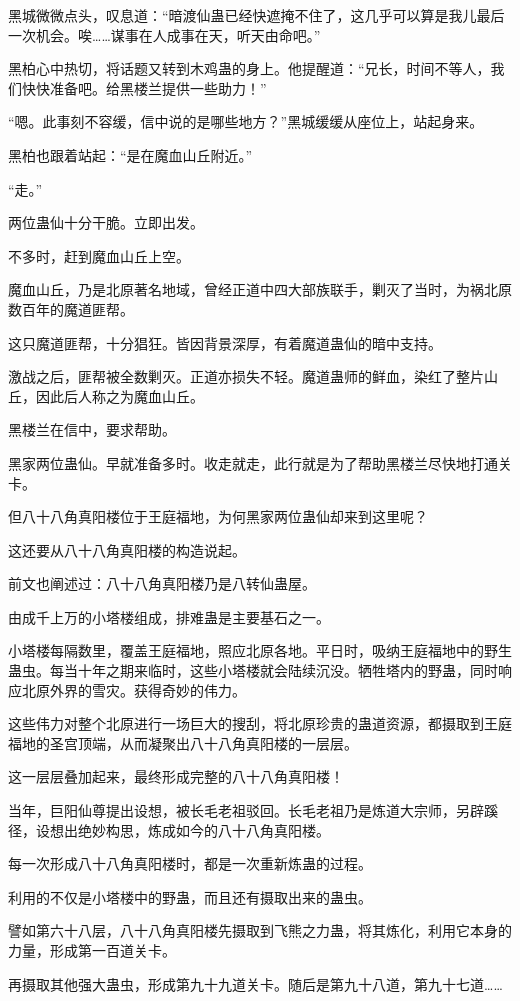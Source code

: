 \begin{this_body}
黑城微微点头，叹息道：“暗渡仙蛊已经快遮掩不住了，这几乎可以算是我儿最后一次机会。唉……谋事在人成事在天，听天由命吧。”

黑柏心中热切，将话题又转到木鸡蛊的身上。他提醒道：“兄长，时间不等人，我们快快准备吧。给黑楼兰提供一些助力！”

“嗯。此事刻不容缓，信中说的是哪些地方？”黑城缓缓从座位上，站起身来。

黑柏也跟着站起：“是在魔血山丘附近。”

“走。”

两位蛊仙十分干脆。立即出发。

不多时，赶到魔血山丘上空。

魔血山丘，乃是北原著名地域，曾经正道中四大部族联手，剿灭了当时，为祸北原数百年的魔道匪帮。

这只魔道匪帮，十分猖狂。皆因背景深厚，有着魔道蛊仙的暗中支持。

激战之后，匪帮被全数剿灭。正道亦损失不轻。魔道蛊师的鲜血，染红了整片山丘，因此后人称之为魔血山丘。

黑楼兰在信中，要求帮助。

黑家两位蛊仙。早就准备多时。收走就走，此行就是为了帮助黑楼兰尽快地打通关卡。

但八十八角真阳楼位于王庭福地，为何黑家两位蛊仙却来到这里呢？

这还要从八十八角真阳楼的构造说起。

前文也阐述过：八十八角真阳楼乃是八转仙蛊屋。

由成千上万的小塔楼组成，排难蛊是主要基石之一。

小塔楼每隔数里，覆盖王庭福地，照应北原各地。平日时，吸纳王庭福地中的野生蛊虫。每当十年之期来临时，这些小塔楼就会陆续沉没。牺牲塔内的野蛊，同时响应北原外界的雪灾。获得奇妙的伟力。

这些伟力对整个北原进行一场巨大的搜刮，将北原珍贵的蛊道资源，都摄取到王庭福地的圣宫顶端，从而凝聚出八十八角真阳楼的一层层。

这一层层叠加起来，最终形成完整的八十八角真阳楼！

当年，巨阳仙尊提出设想，被长毛老祖驳回。长毛老祖乃是炼道大宗师，另辟蹊径，设想出绝妙构思，炼成如今的八十八角真阳楼。

每一次形成八十八角真阳楼时，都是一次重新炼蛊的过程。

利用的不仅是小塔楼中的野蛊，而且还有摄取出来的蛊虫。

譬如第六十八层，八十八角真阳楼先摄取到飞熊之力蛊，将其炼化，利用它本身的力量，形成第一百道关卡。

再摄取其他强大蛊虫，形成第九十九道关卡。随后是第九十八道，第九十七道……


\end{this_body}
